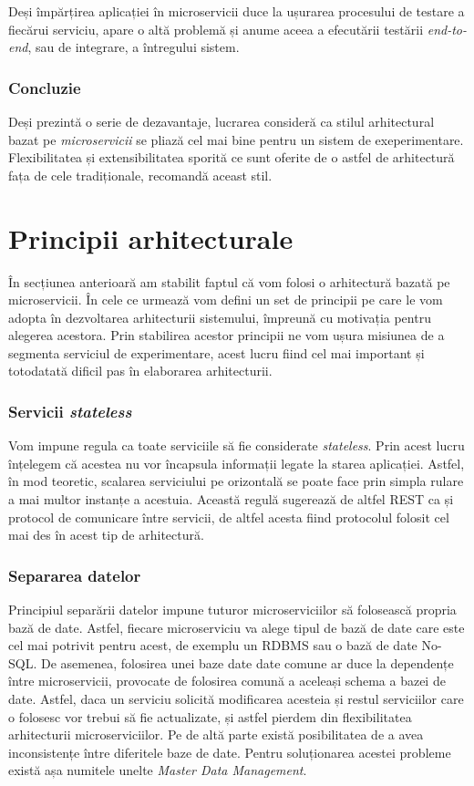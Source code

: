 Deși împărțirea aplicației în microservicii duce la ușurarea procesului de testare a fiecărui serviciu, apare o altă problemă și anume aceea a efecutării testării \textit{end-to-end}, sau de integrare, a întregului sistem.

\subsubsection{Concluzie}

Deși prezintă o serie de dezavantaje, lucrarea consideră ca stilul arhitectural bazat pe \textit{microservicii} se pliază cel mai bine pentru un sistem de exeperimentare. Flexibilitatea și extensibilitatea sporită ce sunt oferite de o astfel de arhitectură fața de cele tradiționale, recomandă aceast stil.

\section{Principii arhitecturale}

În secțiunea anterioară am stabilit faptul că vom folosi o arhitectură bazată pe microservicii. În cele ce urmează vom defini un set de principii pe care le vom adopta în dezvoltarea arhitecturii sistemului, împreună cu motivația pentru alegerea acestora. Prin stabilirea acestor principii ne vom ușura misiunea de a segmenta serviciul de experimentare, acest lucru fiind cel mai important și totodatată dificil pas în elaborarea arhitecturii.

\subsubsection{Servicii \textit{stateless}}

Vom impune regula ca toate serviciile să fie considerate \textit{stateless}. Prin acest lucru înțelegem că acestea nu vor încapsula informații legate la starea aplicației. Astfel, în mod teoretic, scalarea serviciului pe orizontală se poate face prin simpla rulare a mai multor instanțe a acestuia. Această regulă sugerează de altfel REST ca și protocol de comunicare între servicii, de altfel acesta fiind protocolul folosit cel mai des în acest tip de arhitectură. \cite{buildingmicro}

\subsubsection{Separarea datelor}

Principiul separării datelor impune tuturor microserviciilor să folosească propria bază de date. Astfel, fiecare microserviciu va alege tipul de bază de date care este cel mai potrivit pentru acest, de exemplu un RDBMS sau o bază de date No-SQL. De asemenea, folosirea unei baze date date comune ar duce la dependențe între microservicii, provocate de folosirea comună a aceleași schema a bazei de date. Astfel, daca un serviciu solicită modificarea acesteia și restul serviciilor care o folosesc vor trebui să fie actualizate, și astfel pierdem din flexibilitatea arhitecturii microserviciilor. Pe de altă parte există posibilitatea de a avea inconsistențe între diferitele baze de date. Pentru soluționarea acestei probleme există așa numitele unelte \textit{Master Data Management}.

